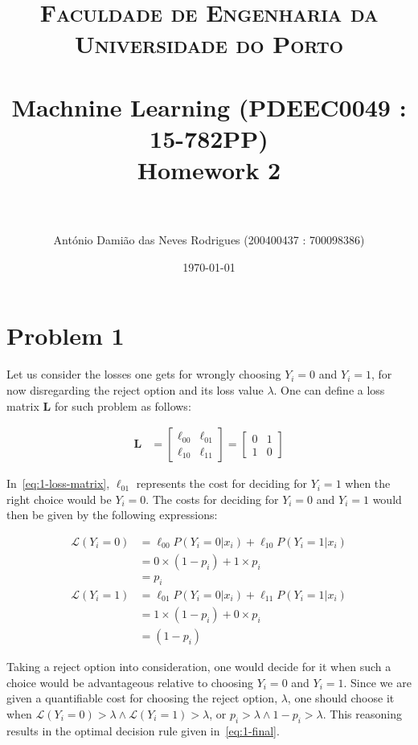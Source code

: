 \documentclass[paper=a4, fontsize=11pt]{scrartcl} %
\title{	
\normalfont \normalsize 
\textsc{Faculdade de Engenharia da Universidade do Porto} \\ [25pt] %
\horrule{0.5pt} \\[0.4cm] %
\LARGE Machnine Learning (PDEEC0049 : 15-782PP)\\ \Large Homework 2 \\ %
\horrule{2pt} \\[0.5cm] %
}
\author{António Damião das Neves Rodrigues (200400437 : 700098386)} %
\date{\normalsize\today} %
\numberwithin{equation}{section} %
\numberwithin{figure}{section} %
\numberwithin{table}{section} %
\begin{document}
\maketitle %

\section{Problem 1}

Let us consider the losses one gets for wrongly choosing $Y_i = 0$ and 
$Y_i = 1$, for now disregarding the reject option and its loss value 
$\lambda$. One can define a loss matrix \textbf{L} for such problem as 
follows:

\begin{equation}
\begin{split}
    \textbf{L}  &= \begin{bmatrix} \ell_{00} & \ell_{01} \\ \ell_{10} & \ell_{11} \end{bmatrix} = \begin{bmatrix} 0 & 1 \\ 1 & 0 \end{bmatrix}
    \label{eq:1-loss-matrix}
\end{split}
\end{equation}

In~\ref{eq:1-loss-matrix}, $\ell_{01}$ represents the cost for deciding for $Y_i = 1$ 
when the right choice would be $Y_i = 0$. The costs for deciding for $Y_i = 0$ 
and $Y_i = 1$ would then be given by the following expressions:

\begin{equation}
\begin{split}
    \mathcal{L}(Y_i = 0)    &= \ell_{00}P(Y_i = 0|x_i) + \ell_{10}P(Y_i = 1|x_i)\\
                            &= 0 \times (1 - p_i) + 1 \times p_i\\
                            &= p_i\\
    \mathcal{L}(Y_i = 1)    &= \ell_{01}P(Y_i = 0|x_i) + \ell_{11}P(Y_i = 1|x_i)\\
                            &= 1 \times (1 - p_i) + 0 \times p_i\\
                            &= (1 - p_i)
    \label{eq:1-losses}
\end{split}
\end{equation}

Taking a reject option into consideration, one would decide for it when such a 
choice would be advantageous relative to choosing $Y_i = 0$ and 
$Y_i = 1$. Since we are given a quantifiable cost for choosing the 
reject option, $\lambda$, one should choose it when 
$\mathcal{L}(Y_i = 0) > \lambda \wedge \mathcal{L}(Y_i = 1) > \lambda$, or 
$p_i > \lambda \wedge 1 - p_i > \lambda$. This reasoning results in the optimal 
decision rule given in~\ref{eq:1-final}.
\end{document}
